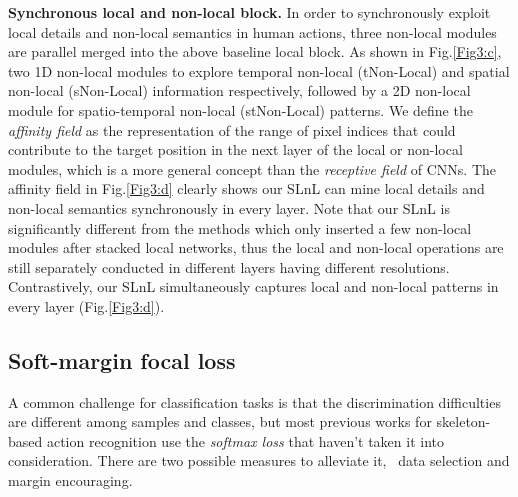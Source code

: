 \documentclass{article}
\begin{document}
\textbf{Synchronous local and non-local block.} In order to synchronously exploit local details and non-local semantics in human actions, three non-local modules are parallel merged into the above baseline local block. As shown in Fig.\ref{Fig3:c}, two 1D non-local modules to explore temporal non-local (tNon-Local) and spatial non-local (sNon-Local) information respectively, followed by a 2D non-local module for spatio-temporal non-local (stNon-Local) patterns. We define the \textit{affinity field} as the representation of the range of pixel indices that could contribute to the target position in the next layer of the local or non-local modules, which is a more general concept than the \textit{receptive field} of CNNs. The affinity field in Fig.\ref{Fig3:d} clearly shows our SLnL can mine local details and non-local semantics synchronously in every layer. Note that our SLnL is significantly different from the methods \cite{DBLP:journals/corr/abs-1711-07971,DBLP:journals/corr/abs-1806-02919} which only inserted a few non-local modules after stacked local networks, thus the local and non-local operations are still separately conducted in different layers having different resolutions. Contrastively, our SLnL simultaneously captures local and non-local patterns in every layer (Fig.\ref{Fig3:d}).

\subsection{Soft-margin focal loss}
A common challenge for classification tasks is that the discrimination difficulties are different among samples and classes, but most previous works for skeleton-based action recognition use the \textit{softmax loss} that haven't taken it into consideration. There are two possible measures to alleviate it, \ie~data selection and margin encouraging.
\end{document}
